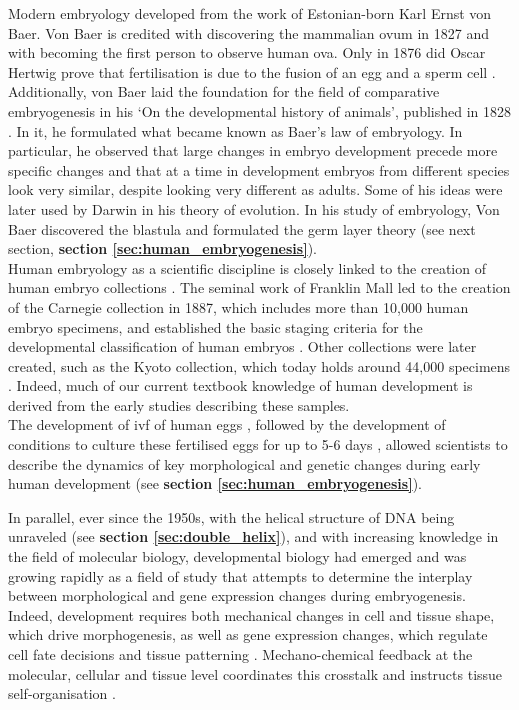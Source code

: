 Modern embryology developed from the work of Estonian-born Karl Ernst von Baer.
Von Baer is credited with discovering the mammalian ovum in 1827 and with becoming the first person to observe human ova.
Only in 1876 did Oscar Hertwig prove that fertilisation is due to the fusion of an egg and a sperm cell \cite{hertwig1875beitraege}.
Additionally, von Baer laid the foundation for the field of comparative embryogenesis in his `On the developmental history of animals', published in 1828 \cite{von1828entwickelungsgeschichte}.
In it, he formulated what became known as Baer's law of embryology.
In particular, he observed that large changes in embryo development precede more specific changes and that at a time in development embryos from different species look very similar, despite looking very different as adults.
Some of his ideas were later used by Darwin in his theory of evolution.
In his study of embryology, Von Baer discovered the blastula and formulated the germ layer theory (see next section, \textbf{section \ref{sec:human_embryogenesis}}).\\

\label{sec:carnegie_collection}
Human embryology as a scientific discipline is closely linked to the creation of human embryo collections \cite{yamada2015human, gasser2014rebirth, shahbazi2020mechanisms}. 
The seminal work of Franklin Mall led to the creation of the Carnegie collection in 1887, which includes more than 10,000 human embryo specimens, and established the basic staging criteria for the developmental classification of human embryos \cite{keibel1910manual}. 
Other collections were later created, such as the Kyoto collection, which today holds around 44,000 specimens \cite{nishimura1968normal}. 
Indeed, much of our current textbook knowledge of human development is derived from the early studies describing these samples.\\

The development of \gls{ivf} of human eggs \cite{edwards1969early, rock1944vitro, shettles1955morula}, followed by the development of conditions to culture these fertilised eggs for up to 5-6 days \cite{edwards1970fertilization, steptoe1971human}, allowed scientists to describe the dynamics of key morphological and genetic changes during early human development (see \textbf{section \ref{sec:human_embryogenesis}}).

In parallel, ever since the 1950s, with the helical structure of DNA being unraveled (see \textbf{section \ref{sec:double_helix}}), and with increasing knowledge in the field of molecular biology, developmental biology had emerged and was growing rapidly as a field of study that attempts to determine the interplay between morphological and gene expression changes during embryogenesis.
Indeed, development requires both mechanical changes in cell and tissue shape, which drive morphogenesis, as well as gene expression changes, which regulate cell fate decisions and tissue patterning \cite{niakan2013analysis, petropoulos2016single}. 
Mechano-chemical feedback at the molecular, cellular and tissue level coordinates this crosstalk and instructs tissue self-organisation \cite{hannezo2019mechanochemical}.

